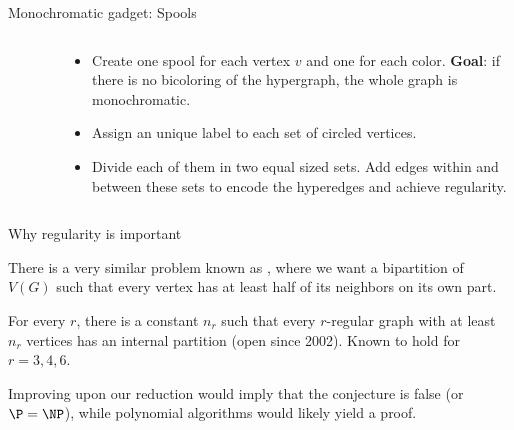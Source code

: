 \begin{frame}{Monochromatic gadget: Spools}
\begin{columns}[T]
\begin{column}{0.44\textwidth}
\begin{figure}[!htb]
        \end{figure}
        \end{column}
        \hfill
        \begin{column}{0.5\textwidth}
            \begin{itemize}
                \item Create one spool for each vertex $v$ and one for each color. \textbf{Goal}: if there is no bicoloring of the hypergraph,
                      the whole graph is monochromatic.
                \item Assign an unique label to each set of circled vertices.
                \item Divide each of them in two equal sized sets. Add edges within and between these sets to encode the hyperedges and achieve regularity.
            \end{itemize}
        \end{column}
    \end{columns}
\end{frame}

\begin{frame}{Why regularity is important}
    \begin{block}{}
        There is a very similar problem known as , where we want a bipartition of $V(G)$ such that every vertex has at least half of its neighbors on its own part.
    \end{block}
    \pause
    \begin{conjecture}
        For every $r$, there is a constant $n_r$ such that every $r$-regular graph with at least $n_r$ vertices has an internal partition (open since 2002). Known to hold for $r=3,4,6$.
    \end{conjecture}
    \pause
    \begin{block}{}
        Improving upon our reduction would imply that the conjecture is false (or $\P = \NP$), while polynomial algorithms would likely yield a proof.
    \end{block}{}
\end{frame}

